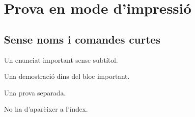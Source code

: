 \documentclass[11pt,a4paper]{article}
\begin{document}
\section{Prova en mode d'impressió}
\subsection{Sense noms i comandes curtes}
\begin{teorema}[][important]
Un enunciat important sense subtítol.
\begin{demostracio}
Una demostració dins del bloc important.
\end{demostracio}
\end{teorema}
\begin{dem}Una prova separada.\end{dem}
\begin{lema}
No ha d'aparèixer a l'índex.
\end{lema}
\indexresultats
\end{document}
